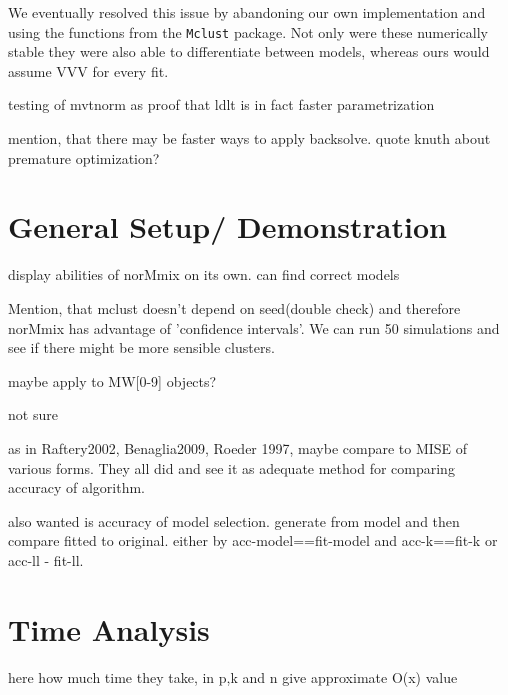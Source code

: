 We eventually resolved this issue by abandoning our own implementation and 
using the functions from the {\tt Mclust} package. Not only were these 
numerically stable they were also able to differentiate between models, whereas
ours would assume VVV for every fit.

testing of mvtnorm as proof that ldlt is in fact faster parametrization

mention, that there may be faster ways to apply backsolve. 
quote knuth about premature optimization?

\section{General Setup/ Demonstration}
display abilities of norMmix on its own. can find correct models

Mention, that mclust doesn't depend on seed(double check) and therefore norMmix has 
advantage of 'confidence intervals'. We can run 50 simulations and see if there
might be more sensible clusters.

maybe apply to MW[0-9] objects?

not sure

as in Raftery2002, Benaglia2009, Roeder 1997, maybe compare to MISE of various 
forms. They all did and see it as adequate method for comparing accuracy of 
algorithm.

also wanted is accuracy of model selection. generate from model and then compare
fitted to original. either by acc-model==fit-model and acc-k==fit-k or acc-ll - fit-ll.

\section{Time Analysis}

here how much time they take, in p,k and n give approximate O(x) value

